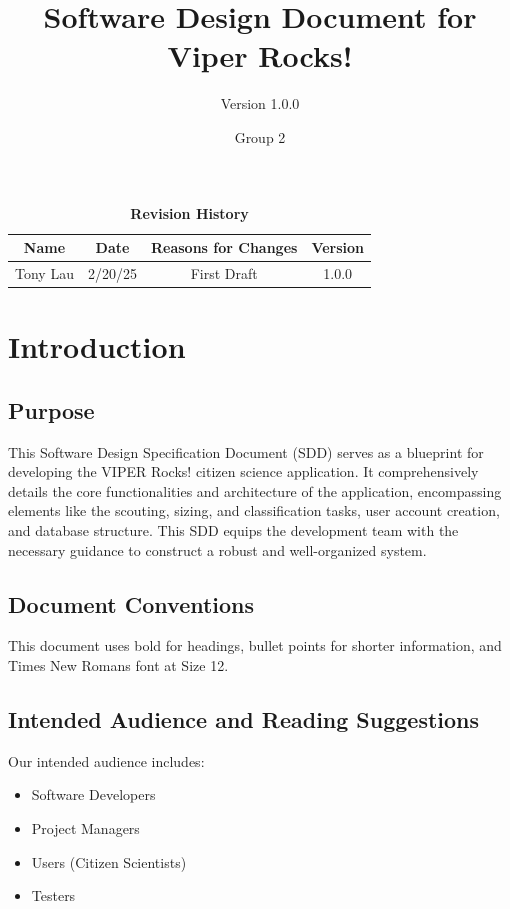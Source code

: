 \documentclass{article}
\begin{document}
\title{Software Design Document for Viper Rocks!}
\author{Version 1.0.0}
\date{Group 2}

\maketitle
\tableofcontents
\newpage

\fancyhf{}
\fancyfoot[C]{\thepage}

\begin{table}[h!]
\centering
\caption{\textbf{Revision History}}
\begin{tabular}{|c|c|c|c|}
\hline
\textbf{Name} & \textbf{Date} & \textbf{Reasons for Changes} & \textbf{Version} \\
\hline
Tony Lau & 2/20/25 & First Draft & 1.0.0 \\
\hline

\hline

\hline

\hline
\end{tabular}
\end{table}

\section{Introduction}
\subsection{Purpose}
This Software Design Specification Document (SDD) serves as a blueprint for developing the VIPER Rocks! citizen science application. It comprehensively details the core functionalities and architecture of the application, encompassing elements like the scouting, sizing, and classification tasks, user account creation, and database structure. This SDD equips the development team with the necessary guidance to construct a robust and well-organized system.
\subsection{Document Conventions}
This document uses bold for headings, bullet points for shorter information, and Times New Romans font at Size 12.
\subsection{Intended Audience and Reading Suggestions}
Our intended audience includes: 
\begin{itemize}
	\item Software Developers
	\item Project Managers
	\item Users (Citizen Scientists)
	\item Testers
\end{itemize}
 
\end{document}
